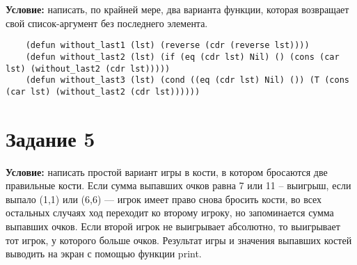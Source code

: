 \textbf{Условие:} написать, по крайней мере, два варианта функции, которая возвращает свой список-аргумент без последнего элемента.

\begin{lstlisting}
    (defun without_last1 (lst) (reverse (cdr (reverse lst))))
    (defun without_last2 (lst) (if (eq (cdr lst) Nil) () (cons (car lst) (without_last2 (cdr lst)))))
    (defun without_last3 (lst) (cond ((eq (cdr lst) Nil) ()) (T (cons (car lst) (without_last2 (cdr lst))))))
\end{lstlisting}


\section{Задание 5}

\textbf{Условие:} написать простой вариант игры в кости, в котором бросаются две правильные кости. Если сумма выпавших очков равна 7 или 11 -- выигрыш, если выпало (1,1) или (6,6) --- игрок имеет право снова бросить кости, во всех остальных случаях ход переходит ко второму игроку, но запоминается сумма выпавших очков. Если второй игрок не выигрывает абсолютно, то выигрывает тот игрок, у которого больше очков. Результат игры и значения выпавших костей выводить на экран с помощью функции print.


